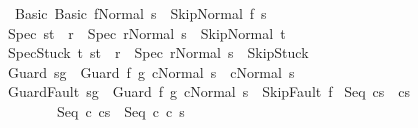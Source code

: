 \begin{isabellebody}
\isanewline
\isanewline
\ \ Basic{\isacharcolon}\ {\isachardoublequoteopen}{\isasymGamma}{\isasymturnstile}{\isacharparenleft}Basic\ f{\isacharcomma}Normal\ s{\isacharparenright}\ {\isasymrightarrow}\ {\isacharparenleft}Skip{\isacharcomma}Normal\ {\isacharparenleft}f\ s{\isacharparenright}{\isacharparenright}{\isachardoublequoteclose}\isanewline
\isanewline
{\isacharbar}\ Spec{\isacharcolon}\ {\isachardoublequoteopen}{\isacharparenleft}s{\isacharcomma}t{\isacharparenright}\ {\isasymin}\ r\ {\isasymLongrightarrow}\ {\isasymGamma}{\isasymturnstile}{\isacharparenleft}Spec\ r{\isacharcomma}Normal\ s{\isacharparenright}\ {\isasymrightarrow}\ {\isacharparenleft}Skip{\isacharcomma}Normal\ t{\isacharparenright}{\isachardoublequoteclose}\isanewline
{\isacharbar}\ SpecStuck{\isacharcolon}\ {\isachardoublequoteopen}{\isasymforall}t{\isachardot}\ {\isacharparenleft}s{\isacharcomma}t{\isacharparenright}\ {\isasymnotin}\ r\ {\isasymLongrightarrow}\ {\isasymGamma}{\isasymturnstile}{\isacharparenleft}Spec\ r{\isacharcomma}Normal\ s{\isacharparenright}\ {\isasymrightarrow}\ {\isacharparenleft}Skip{\isacharcomma}Stuck{\isacharparenright}{\isachardoublequoteclose}\isanewline
\isanewline
{\isacharbar}\ Guard{\isacharcolon}\ {\isachardoublequoteopen}s{\isasymin}g\ {\isasymLongrightarrow}\ {\isasymGamma}{\isasymturnstile}{\isacharparenleft}Guard\ f\ g\ c{\isacharcomma}Normal\ s{\isacharparenright}\ {\isasymrightarrow}\ {\isacharparenleft}c{\isacharcomma}Normal\ s{\isacharparenright}{\isachardoublequoteclose}\isanewline
\ \ \isanewline
{\isacharbar}\ GuardFault{\isacharcolon}\ {\isachardoublequoteopen}s{\isasymnotin}g\ {\isasymLongrightarrow}\ {\isasymGamma}{\isasymturnstile}{\isacharparenleft}Guard\ f\ g\ c{\isacharcomma}Normal\ s{\isacharparenright}\ {\isasymrightarrow}\ {\isacharparenleft}Skip{\isacharcomma}Fault\ f{\isacharparenright}{\isachardoublequoteclose}\isanewline
\isanewline
\isanewline
{\isacharbar}\ Seq{\isacharcolon}\ {\isachardoublequoteopen}{\isasymGamma}{\isasymturnstile}{\isacharparenleft}cs{\isacharparenright}\ {\isasymrightarrow}\ {\isacharparenleft}cs{\isacharprime}{\isacharparenright}\isanewline
\ \ \ \ \ \ \ \ {\isasymLongrightarrow}\ \isanewline
\ \ \ \ \ \ \ \ {\isasymGamma}{\isasymturnstile}{\isacharparenleft}Seq\ c\ cs{\isacharparenright}\ {\isasymrightarrow}\ {\isacharparenleft}Seq\ c\ c\ s{\isacharprime}{\isacharparenright}{\isachardoublequoteclose}\isanewline

\end{isabellebody}
